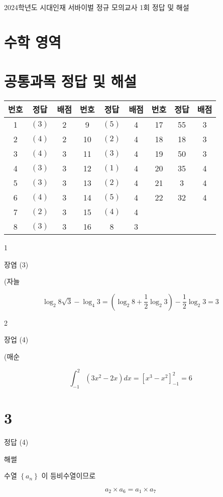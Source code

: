 \documentclass[10pt]{article}
\begin{document}
2024학년도 시대인재 서바이벌 정규 모의교사 1회 정답 및 해설

\section*{수학 영역}
\section*{공통과목 정답 및 해설}
\begin{center}
\begin{tabular}{|c|c|c|c|c|c|c|c|c|}
\hline
번호 & 정답 & 배점 & 번호 & 정답 & 배점 & 번호 & 정답 & 배점 \\
\hline
1 & \((3)\) & 2 & 9 & \((5)\) & 4 & 17 & 55 & 3 \\
\hline
2 & \((4)\) & 2 & 10 & \((2)\) & 4 & 18 & 18 & 3 \\
\hline
3 & \((4)\) & 3 & 11 & \((3)\) & 4 & 19 & 50 & 3 \\
\hline
4 & \((3)\) & 3 & 12 & \((1)\) & 4 & 20 & 35 & 4 \\
\hline
5 & \((3)\) & 3 & 13 & \((2)\) & 4 & 21 & 3 & 4 \\
\hline
6 & \((4)\) & 3 & 14 & \((5)\) & 4 & 22 & 32 & 4 \\
\hline
7 & \((2)\) & 3 & 15 & \((4)\) & 4 &  &  &  \\
\hline
8 & \((3)\) & 3 & 16 & 8 & 3 &  &  &  \\
\hline
\end{tabular}
\end{center}

1

장염 (3)

(자늘

\[
\log _{2} 8 \sqrt{3}-\log _{4} 3=\left(\log _{2} 8+\frac{1}{2} \log _{2} 3\right)-\frac{1}{2} \log _{2} 3=3
\]

2

장업 (4)

(매순

\[
\int_{-1}^{2}\left(3 x^{2}-2 x\right) d x=\left[x^{3}-x^{2}\right]_{-1}^{2}=6
\]

\section*{3}
정답 (4)

해썰

수열 \(\left\{a_{n}\right\}\) 이 등비수열이므로

\[
a_{2} \times a_{6}=a_{1} \times a_{7}
\]
\end{document}
